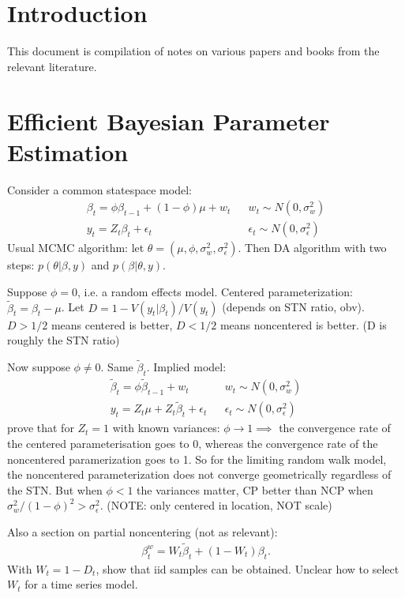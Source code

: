 \documentclass{article}\usepackage[]{graphicx}\usepackage[]{color}
\begin{document}
\section{Introduction}
This document is compilation of notes on various papers and books from the relevant literature.

\section{Efficient Bayesian Parameter Estimation \citet{fruhwirth2004efficient}}
Consider a common statespace model:
\begin{align*}
  \beta_t = \phi\beta_{t-1} + (1-\phi)\mu + w_t && w_t\sim N(0,\sigma_w^2)\\
  y_t = Z_t\beta_t + \epsilon_t && \epsilon_t\sim N(0,\sigma_\epsilon^2)
\end{align*}
Usual MCMC algorithm: let $\theta=(\mu,\phi,\sigma_w^2,\sigma_\epsilon^2)$. Then DA algorithm with two steps: $p(\theta|\beta,y)$ and $p(\beta|\theta,y)$.

Suppose $\phi=0$, i.e. a random effects model. Centered parameterization: $\tilde{\beta}_t = \beta_t - \mu$.  Let $D= 1 - V(y_t|\beta_t)/V(y_t)$ (depends on STN ratio, obv). $D>1/2$ means centered is better, $D<1/2$ means noncentered is better. (D is roughly the STN ratio)

Now suppose $\phi\neq0$. Same $\tilde{\beta}_t$. Implied model:
\begin{align*}
  \tilde{\beta}_t = \phi\tilde{\beta}_{t-1} + w_t && w_t\sim N(0,\sigma_w^2)\\
  y_t = Z_t\mu + Z_t\tilde{\beta}_t + \epsilon_t && \epsilon_t\sim N(0,\sigma_\epsilon^2)
\end{align*}
\citet{pitt1999analytic} prove that for $Z_t=1$ with known variances: $\phi\to 1 \implies$ the convergence rate of the centered parameterisation goes to 0, whereas the convergence rate of the noncentered paramerization goes to 1. So for the limiting random walk model, the noncentered parameterization does not converge geometrically regardless of the STN. But when $\phi < 1$ the variances matter, CP better than NCP when $\sigma_w^2/(1-\phi)^2 > \sigma_\epsilon^2$. (NOTE: only centered in location, NOT scale)

Also a section on partial noncentering (not as relevant): 
\begin{align*}
  \beta_t^w = W_t\tilde{\beta}_t + (1-W_t)\beta_t.
\end{align*}
With $W_t=1-D_t$, \citet{bernardo2003non} show that iid samples can be obtained. Unclear how to select $W_t$ for a time series model.
\end{document}
